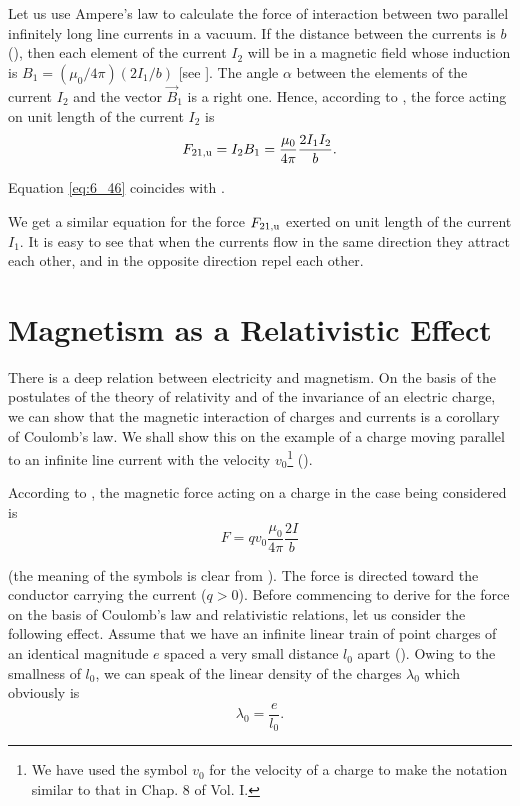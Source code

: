 Let us use Ampere's law to calculate the force of interaction between two parallel infinitely long line currents in a vacuum. If the distance between the currents is $b$ (), then each element of the current $I_2$ will be in a magnetic field whose induction is $B_1=(\mu_0/4\pi)(2I_1/b)$ [see ]. The angle $\alpha$ between the elements of the current $I_2$ and the vector $\vec{B}_1$ is a right one. Hence, according to , the force acting on unit length of the current $I_2$ is
\begin{equation}\label{eq:6_46}
    F_{\text{21,u}} = I_2 B_1 = \frac{\mu_0}{4\pi} \frac{2 I_1 I_2}{b}.
\end{equation}

\noindent
Equation \eqref{eq:6_46} coincides with .

We get a similar equation for the force $F_{\text{21,u}}$ exerted on unit length of the current $I_1$. It is easy to see that when the currents flow in the same direction they attract each other, and in the opposite direction repel each other.

\section{Magnetism as a Relativistic Effect}\label{sec:6_7}

There is a deep relation between electricity and magnetism. On the basis of the postulates of the theory of relativity and of the invariance of an electric charge, we can show that the magnetic interaction of charges and currents is a corollary of Coulomb's law. We shall show this on the example of a charge moving parallel to an infinite line current with the velocity $v_0$\footnote{We have used the symbol $v_0$ for the velocity of a charge to make the notation similar to that in Chap. 8 of Vol. I.} ().

According to , the magnetic force acting on a charge in the case being considered is
\begin{equation}\label{eq:6_47}
    F = q v_0 \frac{\mu_0}{4\pi} \frac{2 I}{b}
\end{equation}

\noindent
(the meaning of the symbols is clear from ). The force is directed toward the conductor carrying the current ($q>0$). Before commencing to derive  for the force on the basis of Coulomb's law and relativistic relations, let us consider the following effect. Assume that we have an infinite linear train of point charges of an identical magnitude $e$ spaced a very small distance $l_0$ apart (). Owing to the smallness of $l_0$, we can speak of the linear density of the charges $\lambda_0$ which obviously is
\begin{equation}\label{eq:6_48}
    \lambda_0 = \frac{e}{l_0}.
\end{equation}

